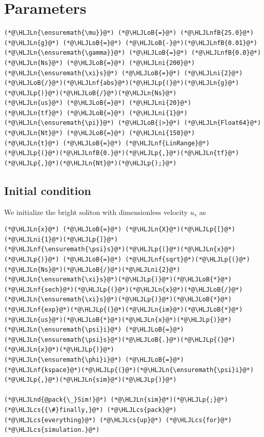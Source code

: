 \documentclass[12pt,a4paper]{article}
\newcommand{\HLJLn}[1]{#1}
\newcommand{\HLJLnd}[1]{\textcolor[RGB]{214,102,97}{#1}}
\newcommand{\HLJLnf}[1]{\textcolor[RGB]{66,102,213}{#1}}
\newcommand{\HLJLnfB}[1]{\textcolor[RGB]{59,151,46}{#1}}
\newcommand{\HLJLni}[1]{\textcolor[RGB]{59,151,46}{#1}}
\newcommand{\HLJLoB}[1]{\textcolor[RGB]{102,102,102}{\textbf{#1}}}
\newcommand{\HLJLp}[1]{#1}
\newcommand{\HLJLcs}[1]{\textcolor[RGB]{153,153,119}{\textit{#1}}}
\begin{document}
\section{Parameters}

\begin{lstlisting}
(*@\HLJLn{\ensuremath{\mu}}@*) (*@\HLJLoB{=}@*) (*@\HLJLnfB{25.0}@*)
(*@\HLJLn{g}@*) (*@\HLJLoB{=}@*) (*@\HLJLoB{-}@*)(*@\HLJLnfB{0.01}@*)
(*@\HLJLn{\ensuremath{\gamma}}@*) (*@\HLJLoB{=}@*) (*@\HLJLnfB{0.0}@*)
(*@\HLJLn{Ns}@*) (*@\HLJLoB{=}@*) (*@\HLJLni{200}@*)
(*@\HLJLn{\ensuremath{\xi}s}@*) (*@\HLJLoB{=}@*) (*@\HLJLni{2}@*)(*@\HLJLoB{/}@*)(*@\HLJLnf{abs}@*)(*@\HLJLp{(}@*)(*@\HLJLn{g}@*)(*@\HLJLp{)}@*)(*@\HLJLoB{/}@*)(*@\HLJLn{Ns}@*)
(*@\HLJLn{us}@*) (*@\HLJLoB{=}@*) (*@\HLJLni{20}@*)
(*@\HLJLn{tf}@*) (*@\HLJLoB{=}@*) (*@\HLJLni{1}@*)(*@\HLJLn{\ensuremath{\pi}}@*) (*@\HLJLoB{|>}@*) (*@\HLJLn{Float64}@*)
(*@\HLJLn{Nt}@*) (*@\HLJLoB{=}@*) (*@\HLJLni{150}@*)
(*@\HLJLn{t}@*) (*@\HLJLoB{=}@*) (*@\HLJLnf{LinRange}@*)(*@\HLJLp{(}@*)(*@\HLJLnfB{0.}@*)(*@\HLJLp{,}@*)(*@\HLJLn{tf}@*)(*@\HLJLp{,}@*)(*@\HLJLn{Nt}@*)(*@\HLJLp{);}@*)
\end{lstlisting}


\subsection{Initial condition}
We initialize the bright soliton with dimensionless velocity $u_s$ as


\begin{lstlisting}
(*@\HLJLn{x}@*) (*@\HLJLoB{=}@*) (*@\HLJLn{X}@*)(*@\HLJLp{[}@*)(*@\HLJLni{1}@*)(*@\HLJLp{]}@*)
(*@\HLJLnf{\ensuremath{\psi}s}@*)(*@\HLJLp{(}@*)(*@\HLJLn{x}@*)(*@\HLJLp{)}@*) (*@\HLJLoB{=}@*) (*@\HLJLnf{sqrt}@*)(*@\HLJLp{(}@*)(*@\HLJLn{Ns}@*)(*@\HLJLoB{/}@*)(*@\HLJLni{2}@*)(*@\HLJLn{\ensuremath{\xi}s}@*)(*@\HLJLp{)}@*)(*@\HLJLoB{*}@*)(*@\HLJLnf{sech}@*)(*@\HLJLp{(}@*)(*@\HLJLn{x}@*)(*@\HLJLoB{/}@*)(*@\HLJLn{\ensuremath{\xi}s}@*)(*@\HLJLp{)}@*)(*@\HLJLoB{*}@*)(*@\HLJLnf{exp}@*)(*@\HLJLp{(}@*)(*@\HLJLn{im}@*)(*@\HLJLoB{*}@*)(*@\HLJLn{us}@*)(*@\HLJLoB{*}@*)(*@\HLJLn{x}@*)(*@\HLJLp{)}@*)
(*@\HLJLn{\ensuremath{\psi}i}@*) (*@\HLJLoB{=}@*) (*@\HLJLn{\ensuremath{\psi}s}@*)(*@\HLJLoB{.}@*)(*@\HLJLp{(}@*)(*@\HLJLn{x}@*)(*@\HLJLp{)}@*)
(*@\HLJLn{\ensuremath{\phi}i}@*) (*@\HLJLoB{=}@*) (*@\HLJLnf{kspace}@*)(*@\HLJLp{(}@*)(*@\HLJLn{\ensuremath{\psi}i}@*)(*@\HLJLp{,}@*)(*@\HLJLn{sim}@*)(*@\HLJLp{)}@*)

(*@\HLJLnd{@pack{\_}Sim!}@*) (*@\HLJLn{sim}@*)(*@\HLJLp{;}@*) (*@\HLJLcs{{\#}finally,}@*) (*@\HLJLcs{pack}@*) (*@\HLJLcs{everything}@*) (*@\HLJLcs{up}@*) (*@\HLJLcs{for}@*) (*@\HLJLcs{simulation.}@*)
\end{lstlisting}
\end{document}
